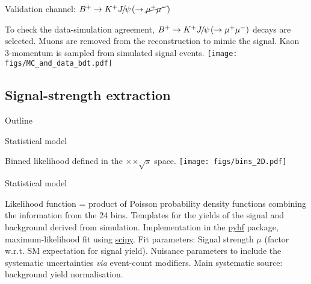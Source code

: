 \begin{frame}{Validation channel: $B^+\rightarrow K^+{J\mskip -3mu/\mskip -2mu\psi\mskip 2mu}(\rightarrow\cancel{\mu^+\mu^-})$}
\bi
\item To check the data-simulation agreement, $B^+\rightarrow K^+{J\mskip -3mu/\mskip -2mu\psi\mskip 2mu}(\rightarrow\mu^+\mu^-)$ decays are selected.
\bi
\itemiii Muons are removed from the reconstruction to mimic the signal.
\itemiii Kaon 3-momentum is sampled from simulated signal events.
\ei
\ei
\vspace{0.25cm}
\centering
\texttt{[image: figs/MC\_and\_data\_bdt.pdf]}
\end{frame}
\subsection{Signal-strength extraction}
\begin{frame}[noframenumbering]{Outline}
\end{frame}
\begin{frame}{Statistical model}
\bi
\item Binned likelihood defined in the \bdtt$\times$\ptK$\times\sqrt{s}$ space.
\bi
{}
\ei
\ei
\vspace{0.5cm}
\centering
\texttt{[image: figs/bins\_2D.pdf]}
\end{frame}
\begin{frame}{Statistical model}
\bi
\item Likelihood function = product of Poisson probability density functions combining the information from the 24 bins. 
\bi
\itemii Templates for the yields of the signal and background derived from simulation.
\itemii Implementation in the \href{https://github.com/scikit-hep/pyhf}{\color{blue!40!gray} pyhf} package, maximum-likelihood fit using \href{https://www.scipy.org/about.html}{\color{blue!40!gray} scipy}.
\ei
\itemi Fit parameters:
\bi
\itemii Signal strength $\mu$ (factor w.r.t. SM expectation for signal yield).
\itemii Nuisance parameters to include the systematic uncertainties \textit{via} event-count modifiers.
\bi
\itemii Main systematic source: background yield normalisation.
\ei
\ei
\ei
\end{frame}
